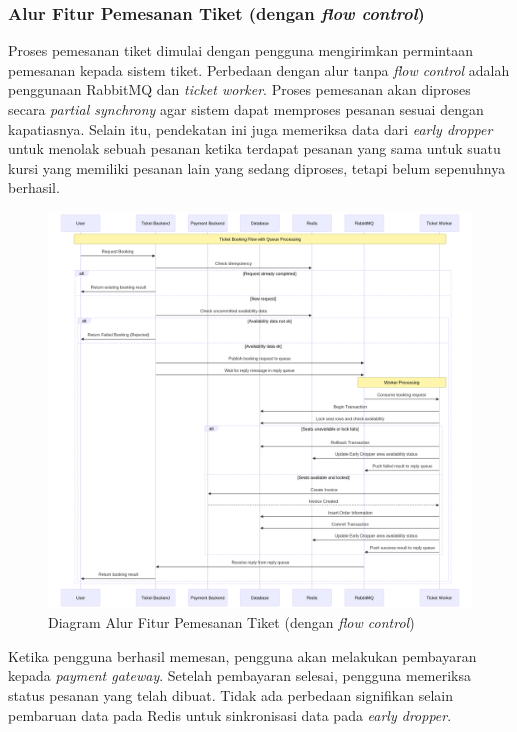 \pagebreak

\subsubsection{Alur Fitur Pemesanan Tiket (dengan \textit{flow control})}

Proses pemesanan tiket dimulai dengan pengguna mengirimkan permintaan pemesanan kepada sistem tiket. Perbedaan dengan alur tanpa \textit{flow control} adalah penggunaan RabbitMQ dan \textit{ticket worker}. Proses pemesanan akan diproses secara \textit{partial synchrony} agar sistem dapat memproses pesanan sesuai dengan kapatiasnya. Selain itu, pendekatan ini juga memeriksa data dari \textit{early dropper} untuk menolak sebuah pesanan ketika terdapat pesanan yang sama untuk suatu kursi yang memiliki pesanan lain yang sedang diproses, tetapi belum sepenuhnya berhasil.

\begin{figure}[h]
    \centering
    \includegraphics[width=1\textwidth]{resources/chapter-3/book-async.png}
    \caption{Diagram Alur Fitur Pemesanan Tiket (dengan \textit{flow control})}
    \label{fig:flow-book-fc}
\end{figure}

\pagebreak

Ketika pengguna berhasil memesan, pengguna akan melakukan pembayaran kepada \textit{payment gateway}. Setelah pembayaran selesai, pengguna memeriksa status pesanan yang telah dibuat. Tidak ada perbedaan signifikan selain pembaruan data pada Redis untuk sinkronisasi data pada \textit{early dropper}.

